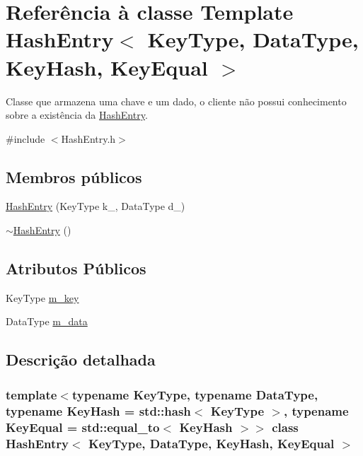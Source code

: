\hypertarget{classHashEntry}{}\section{Referência à classe Template Hash\+Entry$<$ Key\+Type, Data\+Type, Key\+Hash, Key\+Equal $>$}
\label{classHashEntry}


Classe que armazena uma chave e um dado, o cliente não possui conhecimento sobre a existência da \hyperlink{classHashEntry}{Hash\+Entry}.  




{\ttfamily \#include $<$Hash\+Entry.\+h$>$}

\subsection*{Membros públicos}
\begin{DoxyCompactItemize}
\item 
\hyperlink{classHashEntry_a1247b00f740887cdaeb1c77c2fa05225}{Hash\+Entry} (Key\+Type k\+\_\+, Data\+Type d\+\_\+)
\item 
\hyperlink{classHashEntry_a68f0323b47cc8c36cbb0c77631b89d5c}{$\sim$\+Hash\+Entry} ()
\end{DoxyCompactItemize}
\subsection*{Atributos Públicos}
\begin{DoxyCompactItemize}
\item 
Key\+Type \hyperlink{classHashEntry_a244e0393cbbe8a50f96f280fdbbaf311}{m\+\_\+key}
\item 
Data\+Type \hyperlink{classHashEntry_aad378adf91322196c55be012d2fb2371}{m\+\_\+data}
\end{DoxyCompactItemize}


\subsection{Descrição detalhada}
\subsubsection*{template$<$typename Key\+Type, typename Data\+Type, typename Key\+Hash = std\+::hash$<$ Key\+Type $>$, typename Key\+Equal = std\+::equal\+\_\+to$<$ Key\+Hash $>$$>$\newline
class Hash\+Entry$<$ Key\+Type, Data\+Type, Key\+Hash, Key\+Equal $>$}

